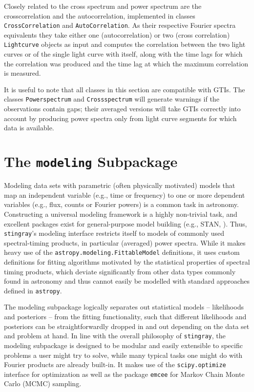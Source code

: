 \documentclass[twocolumn]{aastex62}
\newcommand{\stingray}{\texttt{stingray}\xspace}
\newcommand{\lightcurve}{\texttt{Lightcurve}\xspace}
\newcommand{\crossspectrum}{\texttt{Crossspectrum}\xspace}
\newcommand{\powerspectrum}{\texttt{Powerspectrum}\xspace}
\begin{document}
Closely related to the cross spectrum and power spectrum are the crosscorrelation and the autocorrelation, implemented in classes \texttt{CrossCorrelation} and \texttt{AutoCorrelation}. 
As their respective Fourier spectra equivalents they take either one (autocorrelation) or two (cross correlation) \lightcurve objects as input and computes the correlation between the two light curves or of the single light curve with itself, along with the time lags for which the correlation was produced and the time lag at which the maximum correlation is measured.

It is useful to note that all classes in this section are compatible with GTIs. 
The classes \powerspectrum and \crossspectrum will generate warnings if the observations contain gaps; their averaged versions will take GTIs correctly into account by producing power spectra only from light curve segments for which data is available.  


\section{The \texttt{modeling} Subpackage}
\label{sec:modeling}

Modeling data sets with parametric (often physically motivated) models that map an independent variable (e.g., time or frequency) to one or more dependent variables (e.g., flux, counts or Fourier powers) is a common task in astronomy. 
Constructing a universal modeling framework is a highly non-trivial task, and excellent packages exist for general-purpose model building (e.g., STAN, \citealt{stan}). 
Thus, \stingray's modeling interface restricts itself to models of commonly used spectral-timing products, in particular (averaged) power spectra. 
While it makes heavy use of the \verb|astropy.modeling.FittableModel| definitions, it uses custom definitions for fitting algorithms motivated by the statistical properties of spectral timing products, which deviate significantly from other data types commonly found in astronomy and thus cannot easily be modelled with standard approaches defined in \texttt{astropy}.

The modeling subpackage logically separates out statistical models -- likelihoods and posteriors -- from the fitting functionality, such that different likelihoods and posteriors can be straightforwardly dropped in and out depending on the data set and problem at hand. 
In line with the overall philosophy of \stingray, the modeling subpackage is designed to be modular and easily extensible to specific problems a user might try to solve, while many typical tasks one might do with Fourier products are already built-in. 
It makes use of the \verb|scipy.optimize| interface for optimization as well as the package \texttt{emcee} for Markov Chain Monte Carlo (MCMC) sampling.
\end{document}
